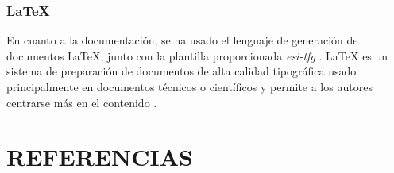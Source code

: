 \documentclass{pre-tfg}
\begin{document}
\subsubsection*{LaTeX}
En cuanto a la documentación, se ha usado el lenguaje de generación de documentos LaTeX, junto con la plantilla proporcionada \textit{esi-tfg} \cite{ARCO}. LaTeX es un sistema de preparación de documentos de alta calidad tipográfica usado principalmente en documentos técnicos o científicos y permite a los autores centrarse más en el contenido \cite{TheLatexProject}.

\clearpage

\section{REFERENCIAS}
%
%
%
%
\end{document}
